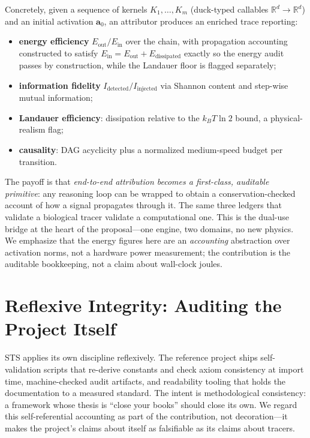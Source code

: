 \documentclass[11pt,a4paper]{article}
\begin{document}
Concretely, given a sequence of kernels $K_1,\dots,K_m$ (duck-typed callables
$\mathbb{R}^d\!\to\!\mathbb{R}^d$) and an initial activation $\bm{a}_0$, an
attributor produces an enriched trace reporting:
\begin{itemize}[leftmargin=1.4em]
  \item \textbf{energy efficiency} $E_\mathrm{out}/E_\mathrm{in}$ over the chain,
        with propagation accounting constructed to satisfy
        $E_\mathrm{in}=E_\mathrm{out}+E_\mathrm{dissipated}$ exactly so the energy
        audit passes by construction, while the Landauer floor is flagged
        separately;
  \item \textbf{information fidelity} $I_\mathrm{detected}/I_\mathrm{injected}$ via
        Shannon content and step-wise mutual information;
  \item \textbf{Landauer efficiency}: dissipation relative to the $k_B T \ln 2$
        bound, a physical-realism flag;
  \item \textbf{causality}: DAG acyclicity plus a normalized medium-speed budget
        per transition.
\end{itemize}

The payoff is that \emph{end-to-end attribution becomes a first-class, auditable
primitive}: any reasoning loop can be wrapped to obtain a conservation-checked
account of how a signal propagates through it. The same three ledgers that
validate a biological tracer validate a computational one. This is the dual-use
bridge at the heart of the proposal---one engine, two domains, no new physics. We
emphasize that the energy figures here are an \emph{accounting} abstraction over
activation norms, not a hardware power measurement; the contribution is the
auditable bookkeeping, not a claim about wall-clock joules.

\section{Reflexive Integrity: Auditing the Project Itself}
\label{sec:meta}

STS applies its own discipline reflexively. The reference project ships
self-validation scripts that re-derive constants and check axiom consistency at
import time, machine-checked audit artifacts, and readability tooling that holds
the documentation to a measured standard. The intent is methodological
consistency: a framework whose thesis is ``close your books'' should close its
own. We regard this self-referential accounting as part of the contribution, not
decoration---it makes the project's claims about itself as falsifiable as its
claims about tracers.
\end{document}
